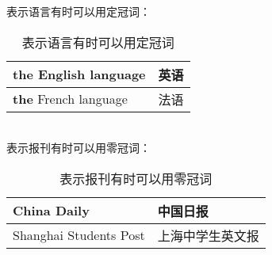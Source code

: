 \documentclass[UTF8]{ctexart}
\begin{document}
    表示语言有时可以用定冠词：
    \begin{table}[h!]
        \begin{center}
            \ttfamily
            \begin{tabular}{p{180pt}|p{100pt}}
                \hline
                \textbf{the} English language&英语\\ \hline
                \textbf{the} French language&法语\\ \hline
            \end{tabular}
            \rmfamily
            \caption{表示语言有时可以用定冠词}
        \end{center}
    \end{table}\\
    表示报刊有时可以用零冠词：
    \begin{table}[h!]
        \begin{center}
            \ttfamily
            \begin{tabular}{p{180pt}|p{100pt}}
                \hline
                China Daily&中国日报\\ \hline
                Shanghai Students Post&上海中学生英文报\\ \hline
            \end{tabular}
            \rmfamily
            \caption{表示报刊有时可以用零冠词}
        \end{center}
    \end{table}

\newpage
\end{document}

